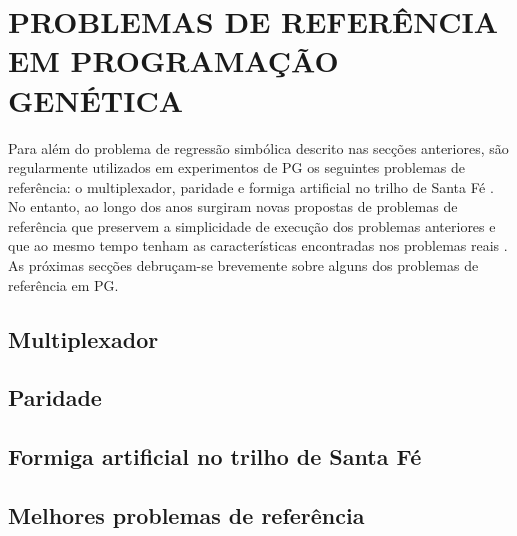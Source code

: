 \section{PROBLEMAS DE REFERÊNCIA EM PROGRAMAÇÃO GENÉTICA}
\label{sec:2benchmarks}

Para além do problema de regressão simbólica descrito nas secções anteriores, são regularmente utilizados em experimentos de \ac{PG} os 
seguintes problemas de referência: o multiplexador, paridade e formiga artificial no trilho de Santa Fé \citep{Koza1992}. No entanto, ao longo
dos anos surgiram novas propostas de problemas de referência que preservem a simplicidade de execução dos problemas anteriores e que ao mesmo
tempo tenham as características encontradas nos problemas reais \citep{McDermott:2012:GECCO}. As próximas secções debruçam-se brevemente
sobre alguns dos problemas de referência em \ac{PG}.

\subsection{Multiplexador} 
\subsection{Paridade}
\subsection{Formiga artificial no trilho de Santa Fé}
\subsection{Melhores problemas de referência}